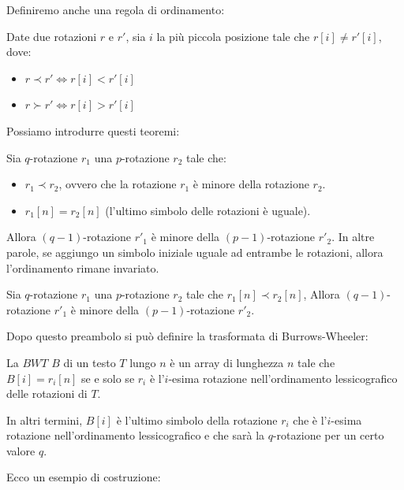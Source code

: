 Definiremo anche una regola di ordinamento:
\begin{definizione}
    Date due rotazioni $r$ e $r'$, sia $i$ la più piccola posizione tale che
    $r[i]\ne r'[i]$, dove:
    \begin{itemize}
        \item $r \prec r'\iff r[i] < r'[i]$
        \item $r \succ r'\iff r[i] > r'[i]$
    \end{itemize}
\end{definizione}
Possiamo introdurre questi teoremi:
\begin{teorema}
    \label{th:ord-rot-1}
    Sia $q$-rotazione $r_1$ una $p$-rotazione $r_2$ tale che:
    \begin{itemize}
        \item $r_1 \prec r_2$, ovvero che la rotazione $r_1$ è minore della
              rotazione $r_2$.
        \item $r_1[n] = r_2[n]$ (l'ultimo simbolo delle rotazioni è uguale).
    \end{itemize}
    Allora $(q - 1)$-rotazione $r'_1$ è minore della $(p - 1)$-rotazione $r'_2$.
    In altre parole, se aggiungo un simbolo iniziale uguale ad entrambe le
    rotazioni, allora l'ordinamento rimane invariato.
\end{teorema}
\begin{teorema}
    \label{th:ord-rot-2}
    Sia $q$-rotazione $r_1$ una $p$-rotazione $r_2$ tale che $r_1[n] \prec r_2[n]$,
    Allora $(q - 1)$-rotazione $r'_1$ è minore della $(p - 1)$-rotazione $r'_2$.
\end{teorema}
Dopo questo preambolo si può definire la trasformata di Burrows-Wheeler:
\begin{definizione}
    La $BWT$ $B$ di un testo $T$ lungo $n$ è un array di lunghezza $n$ tale che
    $B[i] = r_i[n]$ se e solo se $r_i$ è l'$i$-esima rotazione nell'ordinamento
    lessicografico delle rotazioni di $T$.

    In altri termini, $B[i]$ è l'ultimo simbolo della rotazione $r_i$ che è
    l'$i$-esima rotazione nell'ordinamento lessicografico e che sarà la
    $q$-rotazione per un certo valore $q$.
\end{definizione}
Ecco un esempio di costruzione:
